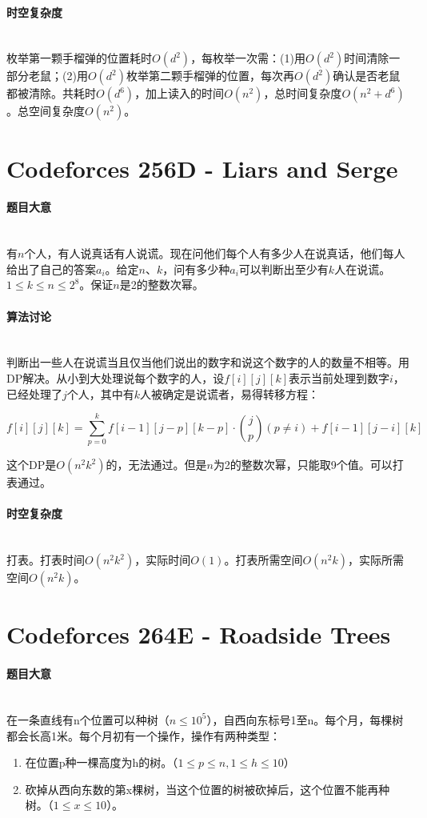 \documentclass[UTF8]{ctexart}
\newcommand{\myparagraph}[1]{\paragraph{#1}\mbox{}\\}
\theoremstyle{nonumberplain}
\begin{document}
		\myparagraph{时空复杂度}
		
			枚举第一颗手榴弹的位置耗时$O(d^2)$，每枚举一次需：(1)用$O(d^2)$时间清除一部分老鼠；(2)用$O(d^2)$枚举第二颗手榴弹的位置，每次再$O(d^2)$确认是否老鼠都被清除。共耗时$O(d^6)$，加上读入的时间$O(n^2)$，总时间复杂度$O(n^2+d^6)$。总空间复杂度$O(n^2)$。
	
	\section{Codeforces 256D - Liars and Serge}
	
		\myparagraph{题目大意}
		
			有$n$个人，有人说真话有人说谎。现在问他们每个人有多少人在说真话，他们每人给出了自己的答案$a_i$。给定$n$、$k$，问有多少种${a_i}$可以判断出至少有$k$人在说谎。$1 \leq k \leq n \leq 2^8$。保证$n$是2的整数次幂。
		
		\myparagraph{算法讨论}
		
			判断出一些人在说谎当且仅当他们说出的数字和说这个数字的人的数量不相等。用DP解决。从小到大处理说每个数字的人，设$f[i][j][k]$表示当前处理到数字$i$，已经处理了$j$个人，其中有$k$人被确定是说谎者，易得转移方程：
			
			$$f[i][j][k]=\sum_{p=0}^k f[i-1][j-p][k-p] \cdot \binom{j}{p} (p\not=i) + f[i-1][j-i][k]$$
			
			这个DP是$O(n^2k^2)$的，无法通过。但是$n$为2的整数次幂，只能取9个值。可以打表通过。
		
		\myparagraph{时空复杂度}
		
			打表。打表时间$O(n^2k^2)$，实际时间$O(1)$。打表所需空间$O(n^2k)$，实际所需空间$O(n^2k)$。
	
	\section{Codeforces 264E - Roadside Trees}
	
		\myparagraph{题目大意}
		
			在一条直线有n个位置可以种树（$n \leq 10^5$），自西向东标号1至n。每个月，每棵树都会长高1米。每个月初有一个操作，操作有两种类型：
			
			\begin{enumerate}
				\item 在位置p种一棵高度为h的树。（$1 \leq p \leq n, 1 \leq h \leq 10$）
				\item 砍掉从西向东数的第x棵树，当这个位置的树被砍掉后，这个位置不能再种树。（$1 \leq x \leq 10$）。
			\end{enumerate}
			
\end{document}
